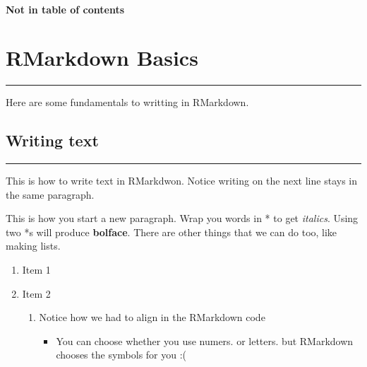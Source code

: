 \documentclass[
]{article}
\providecommand{\tightlist}{%
  \setlength{\itemsep}{0pt}\setlength{\parskip}{0pt}}
\begin{document}
\hypertarget{not-in-table-of-contents}{%
\paragraph{Not in table of contents}\label{not-in-table-of-contents}}

\hypertarget{rmarkdown-basics}{%
\section{RMarkdown Basics}\label{rmarkdown-basics}}

\begin{center}\rule{0.5\linewidth}{0.5pt}\end{center}

Here are some fundamentals to writting in RMarkdown.

\hypertarget{writing-text}{%
\subsection{Writing text}\label{writing-text}}

\begin{center}\rule{0.5\linewidth}{0.5pt}\end{center}

This is how to write text in RMarkdwon. Notice writing on the next line
stays in the same paragraph.

This is how you start a new paragraph. Wrap you words in * to get
\emph{italics}. Using two *s will produce \textbf{bolface}. There are
other things that we can do too, like making lists.

\begin{enumerate}
\def\labelenumi{\arabic{enumi}.}
\tightlist
\item
  Item 1
\item
  Item 2

  \begin{enumerate}
  \def\labelenumii{\alph{enumii}.}
  \setcounter{enumii}{1}
  \tightlist
  \item
    Notice how we had to align in the RMarkdown code

    \begin{itemize}
    \tightlist
    \item
      You can choose whether you use numers. or letters. but RMarkdown
      chooses the symbols for you :(
    \end{itemize}
  \end{enumerate}
\end{enumerate}
\end{document}
